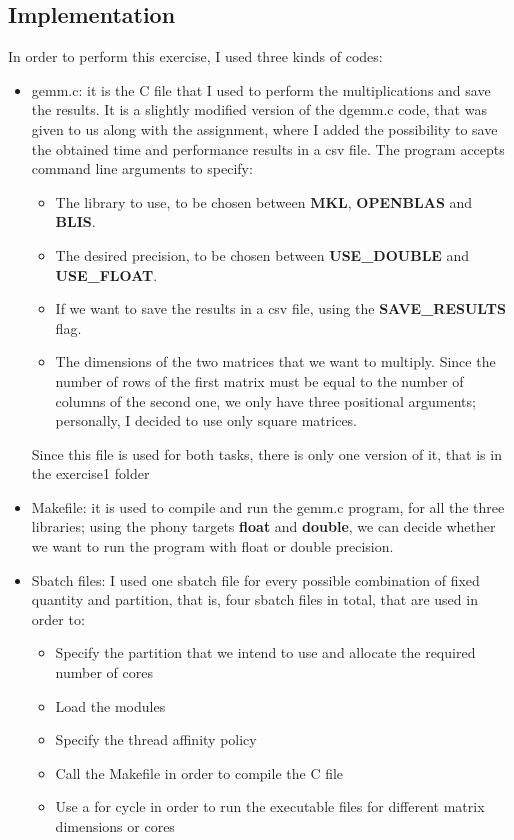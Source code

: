 \documentclass[12pt]{article}
\begin{document}
    \subsection{Implementation}
        In order to perform this exercise, I used three kinds of codes:
        \begin{itemize}
            \item gemm.c: it is the C file that I used to perform the multiplications and save the results. It is a slightly modified version of the dgemm.c code, that was given to us along with the assignment, where I added the possibility to save the obtained time and performance results in a csv file.\newline
            The program accepts command line arguments to specify:
            \begin{itemize}
                \item The library to use, to be chosen between \textbf{MKL}, \textbf{OPENBLAS} and \textbf{BLIS}.
                \item The desired precision, to be chosen between \textbf{USE\_DOUBLE} and \textbf{USE\_FLOAT}.
                \item If we want to save the results in a csv file, using the \textbf{SAVE\_RESULTS} flag.
                \item The dimensions of the two matrices that we want to multiply. Since the number of rows of the first matrix must be equal to the number of columns of the second one, we only have three positional arguments; personally, I decided to use only square matrices.
            \end{itemize}
            Since this file is used for both tasks, there is only one version of it, that is in the exercise1 folder
            \item Makefile: it is used to compile and run the gemm.c program, for all the three libraries; using the phony targets \textbf{float} and \textbf{double}, we can decide whether we want to run the program with float or double precision.
            \item Sbatch files: I used one sbatch file for every possible combination of fixed quantity and partition, that is, four sbatch files in total, that are used in order to:
            \begin{itemize}
                \item Specify the partition that we intend to use and allocate the required number of cores
                \item Load the modules
                \item Specify the thread affinity policy
                \item Call the Makefile in order to compile the C file
                \item Use a for cycle in order to run the executable files for different matrix dimensions or cores
            \end{itemize}
        \end{itemize} 
    
\end{document}
